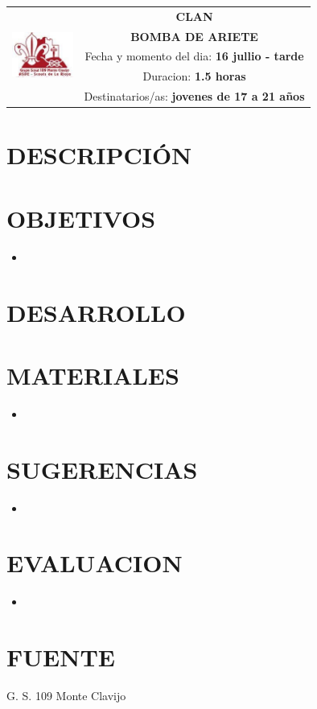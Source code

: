 \documentclass[72pt]{article}
\newlength{\w}
\begin{document}
\large
{}\selectfont
\begin{tabular}{|p{2cm}|c|}
\hline
\multirow{5}{*}{\includegraphics[width=2cm]{logo}} & \textbf{CLAN} \\ %
\cline{2-2}
& \textbf{BOMBA DE ARIETE} \\ %
\cline{2-2}
& \parbox{\textwidth-4cm}{Fecha y momento del dia: \textbf{16 jullio - tarde}} \\ %
& \parbox{\textwidth-4cm}{Duracion: \textbf{1.5 horas}} \\ %
& \parbox{\textwidth-4cm}{Destinatarios/as: \textbf{jovenes de 17 a 21 años}} \\ %
\hline
\end{tabular}

\section*{DESCRIPCI\'ON}

\section*{OBJETIVOS}
\begin{itemize}
    \item
\end{itemize}

\section*{DESARROLLO}

\section*{MATERIALES}
\begin{itemize}
    \item
\end{itemize}
\section*{SUGERENCIAS}

\begin{itemize}
    \item
\end{itemize}

\section*{EVALUACION}
\begin{itemize}
    \item
\end{itemize}

\section*{FUENTE}
G. S. 109 Monte Clavijo
\end{document}
